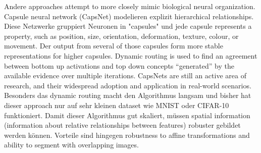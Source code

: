 Andere approaches attempt to more closely mimic biological neural organization. Capsule neural network (CapsNet) modelieren explizit hierarchical relationships. Diese Netzwerke gruppiert Neuronen in "capsules" und jede capsule  represents a property, such as position, size, orientation, deformation, texture, colour, or movement. Der output from several of those capsules form more stable representations for higher capsules. Dynamic routing is used to find an agreement between bottom up activations and top down concepts ``generated'' by the available evidence over multiple iterations. CapsNets are still an active area of research, and their widespread adoption and application in real-world scenarios. Besonders das dynamic routing macht den Algorithmus langsam und bisher hat dieser approach nur auf sehr kleinen dataset wie MNIST oder CIFAR-10 funktioniert. Damit dieser Algorithmus gut skaliert, müssen spatial information (information about relative relationships between features) robuster gebildet werden können. Vorteile sind hingegen robustness to affine transformations and ability to segment with overlapping images.

